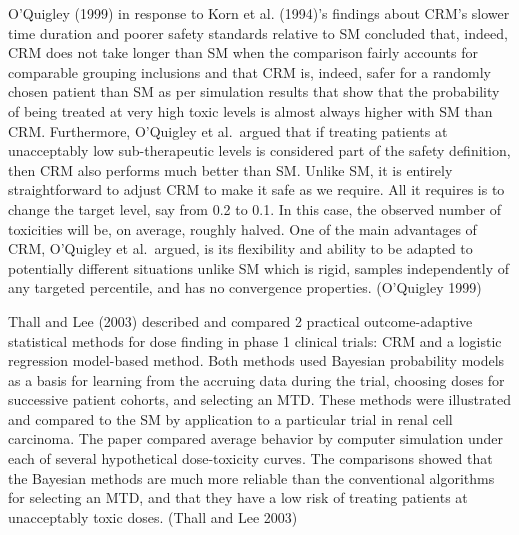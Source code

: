 \documentclass[
]{article}
\begin{document}
O'Quigley (1999) in response to Korn et al. (1994)'s findings about
CRM's slower time duration and poorer safety standards relative to SM
concluded that, indeed, CRM does not take longer than SM when the
comparison fairly accounts for comparable grouping inclusions and that
CRM is, indeed, safer for a randomly chosen patient than SM as per
simulation results that show that the probability of being treated at
very high toxic levels is almost always higher with SM than CRM.
Furthermore, O'Quigley et al.~argued that if treating patients at
unacceptably low sub-therapeutic levels is considered part of the safety
definition, then CRM also performs much better than SM. Unlike SM, it is
entirely straightforward to adjust CRM to make it safe as we require.
All it requires is to change the target level, say from 0.2 to 0.1. In
this case, the observed number of toxicities will be, on average,
roughly halved. One of the main advantages of CRM, O'Quigley et
al.~argued, is its flexibility and ability to be adapted to potentially
different situations unlike SM which is rigid, samples independently of
any targeted percentile, and has no convergence properties. (O'Quigley
1999)

Thall and Lee (2003) described and compared 2 practical outcome-adaptive
statistical methods for dose finding in phase 1 clinical trials: CRM and
a logistic regression model-based method. Both methods used Bayesian
probability models as a basis for learning from the accruing data during
the trial, choosing doses for successive patient cohorts, and selecting
an MTD. These methods were illustrated and compared to the SM by
application to a particular trial in renal cell carcinoma. The paper
compared average behavior by computer simulation under each of several
hypothetical dose-toxicity curves. The comparisons showed that the
Bayesian methods are much more reliable than the conventional algorithms
for selecting an MTD, and that they have a low risk of treating patients
at unacceptably toxic doses. (Thall and Lee 2003)
\end{document}

